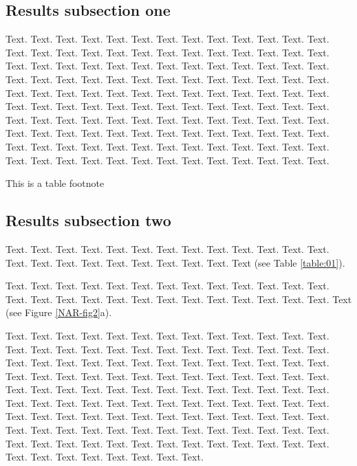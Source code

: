 \documentclass[a4,center,fleqn]{NAR}
\begin{document}
\subsection{Results subsection one}

Text. Text. Text. Text. Text. Text. Text. Text. Text. Text. Text.
Text. Text. Text. Text. Text. Text. Text. Text. Text. Text. Text.
Text. Text. Text. Text. Text. Text. Text. Text. Text. Text. Text.
Text. Text. Text. Text. Text. Text. Text. Text. Text. Text. Text.
Text. Text. Text. Text. Text. Text. Text. Text. Text. Text. Text.
Text. Text. Text. Text. Text. Text. Text. Text. Text. Text. Text.
Text. Text. Text. Text. Text. Text. Text. Text. Text. Text. Text.
Text. Text. Text. Text. Text. Text. Text. Text. Text. Text. Text.
Text. Text. Text. Text. Text. Text. Text. Text. Text. Text. Text.
Text. Text. Text. Text. Text. Text. Text. Text. Text. Text. Text.
Text. Text. Text. Text. Text. Text. Text. Text. Text. Text. Text.
Text. Text. Text. Text. Text. Text. Text. Text. Text.

\begin{table}[b]
{This is a table footnote}
\end{table}


\subsection{Results subsection two}

Text.  Text. Text. Text. Text. Text. Text. Text. Text. Text. Text.
Text. Text. Text. Text. Text. Text. Text. Text. Text. Text. Text.
Text (see Table \ref{table:01}).

Text. Text. Text. Text. Text. Text.
Text. Text. Text. Text. Text. Text. Text. Text. Text. Text. Text.
Text. Text. Text. Text. Text. Text. Text. Text. Text.
Text (see Figure \ref{NAR-fig2}a).

Text. Text. Text. Text. Text.
Text. Text. Text. Text. Text. Text. Text. Text. Text. Text. Text.
Text. Text. Text. Text. Text. Text. Text. Text. Text. Text. Text.
Text. Text. Text. Text. Text. Text. Text. Text. Text. Text. Text.
Text. Text. Text. Text. Text. Text. Text. Text. Text. Text. Text.
Text. Text. Text. Text. Text. Text. Text. Text. Text. Text. Text.
Text. Text. Text. Text. Text. Text. Text. Text. Text. Text. Text.
Text. Text. Text. Text. Text. Text. Text. Text. Text. Text. Text.
Text. Text. Text. Text. Text. Text. Text. Text. Text. Text. Text.
Text. Text. Text. Text. Text. Text. Text. Text. Text. Text. Text.
Text. Text. Text. Text. Text. Text. Text. Text. Text. Text. Text.
Text. Text. Text. Text. Text. Text. Text. Text. Text. Text.
\end{document}
